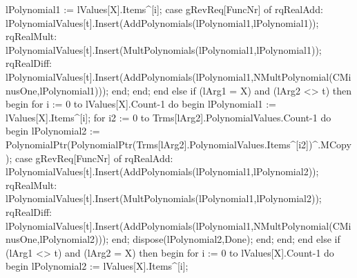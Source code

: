                                           lPolynomial1 := lValues[X].Items^[i];
                                          case gRevReq[FuncNr] of
                                             rqRealAdd:
                                                lPolynomialValues[t].Insert(AddPolynomials(lPolynomial1,lPolynomial1));
                                             rqRealMult:
                                                lPolynomialValues[t].Insert(MultPolynomials(lPolynomial1,lPolynomial1));
                                             rqRealDiff:
                                                lPolynomialValues[t].Insert(AddPolynomials(lPolynomial1,NMultPolynomial(CMinusOne,lPolynomial1)));
                                          end;
                                       end;
                                    end
                                    else if (lArg1 = X) and (lArg2 <> t) then
                                    begin
                                       for i := 0 to lValues[X].Count-1 do
                                       begin
                                          lPolynomial1 := lValues[X].Items^[i];
                                          for i2 := 0 to Trms[lArg2].PolynomialValues.Count-1 do
                                          begin
                                             lPolynomial2 := PolynomialPtr(PolynomialPtr(Trms[lArg2].PolynomialValues.Items^[i2])^.MCopy);
                                             case gRevReq[FuncNr] of
                                                rqRealAdd:
                                                   lPolynomialValues[t].Insert(AddPolynomials(lPolynomial1,lPolynomial2));
                                                rqRealMult:
                                                   lPolynomialValues[t].Insert(MultPolynomials(lPolynomial1,lPolynomial2));
                                                rqRealDiff:
                                                   lPolynomialValues[t].Insert(AddPolynomials(lPolynomial1,NMultPolynomial(CMinusOne,lPolynomial2)));
                                             end;
                                             dispose(lPolynomial2,Done);
                                          end;
                                       end;
                                    end
                                    else  if (lArg1 <> t) and (lArg2 = X) then
                                    begin
                                       for i := 0 to lValues[X].Count-1 do
                                       begin
                                          lPolynomial2 := lValues[X].Items^[i];
